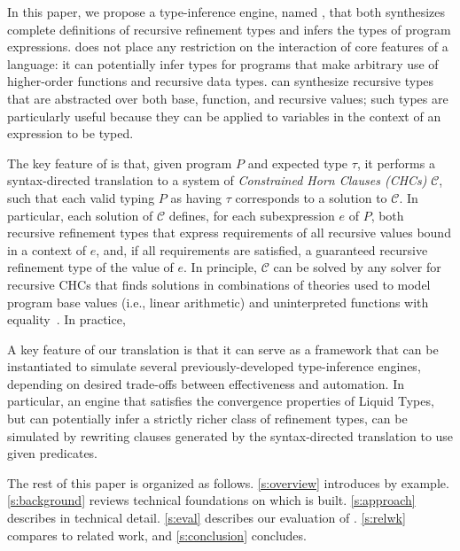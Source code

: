 In this paper, we propose a type-inference engine, named \sys, that
both synthesizes complete definitions of recursive refinement types
and infers the types of program expressions.
%
\sys does not place any restriction on the interaction of core
features of a language: it can potentially infer types for programs
that make arbitrary use of higher-order functions and recursive data
types.
%
\sys can synthesize recursive types that are abstracted over both
base, function, and recursive values;
%
such types are particularly useful because they can be applied to
variables in the context of an expression to be typed.

The key feature of \sys is that, given program $P$ and expected type
$\tau$, it performs a syntax-directed translation to a system of
\emph{Constrained Horn Clauses (CHCs)} $\mathcal{C}$, such that each
valid typing $P$ as having $\tau$ corresponds to a solution to
$\mathcal{C}$.
%
In particular, each solution of $\mathcal{C}$ defines, for each
subexpression $e$ of $P$, both recursive refinement types that express
requirements of all recursive values bound in a context of $e$, and,
if all requirements are satisfied, a guaranteed recursive refinement
type of the value of $e$.
%
In principle, $\mathcal{C}$ can be solved by any solver for recursive
CHCs that finds solutions in combinations of theories used to model
program base values (i.e., linear arithmetic) and uninterpreted
functions with equality~\cite{bjorner13}.
%
In practice, 

A key feature of our translation is that it can serve as a framework
that can be instantiated to simulate several previously-developed
type-inference engines, depending on desired trade-offs between
effectiveness and automation.
%
In particular, an engine that satisfies the convergence properties of
Liquid Types, but can potentially infer a strictly richer class of
refinement types, can be simulated by rewriting clauses generated by
the syntax-directed translation to use given predicates.

The rest of this paper is organized as follows.
%
\autoref{s:overview} introduces \sys by example.
%
\autoref{s:background} reviews technical foundations on which \sys is
built.
%
\autoref{s:approach} describes \sys in technical detail.
%
\autoref{s:eval} describes our evaluation of \sys.
%
\autoref{s:relwk} compares \sys to related work, and %
\autoref{s:conclusion} concludes.
